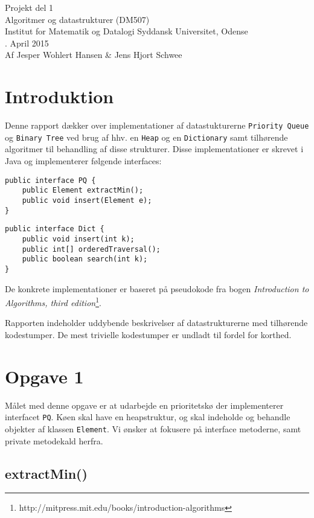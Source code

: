\documentclass{article}
\begin{document}
{\centering
\huge
Projekt del 1\\
Algoritmer og datastrukturer (DM507)\\
\large
\bigskip
Institut for Matematik og Datalogi Syddansk Universitet, Odense\\
. April 2015\\
\bigskip
Af Jesper Wohlert Hansen \& Jens Hjort Schwee\\
}
\newpage

\section*{Introduktion}
Denne rapport dækker over implementationer af datastukturerne \texttt{Priority Queue} og \texttt{Binary Tree} ved brug af hhv. en \texttt{Heap} og en \texttt{Dictionary} samt tilhørende algoritmer til behandling af disse strukturer. Disse implementationer er skrevet i Java og implementerer følgende interfaces:

\begin{verbatim}
public interface PQ {
    public Element extractMin();
    public void insert(Element e);
}
\end{verbatim}


\begin{verbatim}
public interface Dict {
    public void insert(int k);
    public int[] orderedTraversal();
    public boolean search(int k);
}
\end{verbatim}

De konkrete implementationer er baseret på pseudokode fra bogen \emph{Introduction to Algorithms, third edition}\footnote{http://mitpress.mit.edu/books/introduction-algorithms}.


Rapporten indeholder uddybende beskrivelser af datastrukturerne med tilhørende kodestumper. De mest trivielle kodestumper er undladt til fordel for korthed.

\newpage

\section*{Opgave 1}
Målet med denne opgave er at udarbejde en prioritetskø der implementerer interfacet \texttt{PQ}. Køen skal have en heapstruktur, og skal indeholde og behandle objekter af klassen \texttt{Element}. Vi ønsker at fokusere på interface metoderne, samt private metodekald herfra.

\subsection*{extractMin()}
\end{document}
